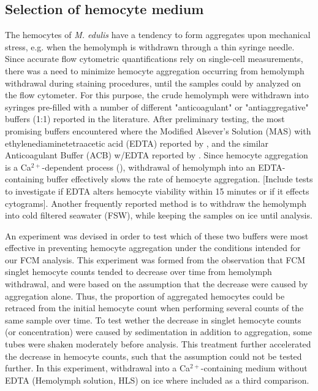 \subsection{Selection of hemocyte medium}
The hemocytes of \emph{M. edulis} have a tendency to form aggregates upon mechanical stress, e.g. when the hemolymph is withdrawn through a thin syringe needle. Since accurate flow cytometric quantifications rely on single-cell measurements, there was a need to minimize hemocyte aggregation occurring from hemolymph withdrawal during staining procedures, until the samples could by analyzed on the flow cytometer. For this purpose, the crude hemolymph were withdrawn into syringes pre-filled with a number of different "anticoagulant" or "antiaggregative" buffers (1:1) reported in the literature. After preliminary testing, the most promising buffers encountered where the Modified Alsever's Solution (MAS) with ethylenediaminetetraacetic acid (EDTA) reported by \cite{LeFoll2010}, and the similar Anticoagulant Buffer (ACB) w/EDTA reported by \cite{Pipe1997}. Since hemocyte aggregation is a Ca$^{2+}$-dependent process (\cite{Rolton2020}), withdrawal of hemolymph into an EDTA-containing buffer effectively slows the rate of hemocyte aggregation. [Include tests to investigate if EDTA alters hemocyte viability within 15 minutes or if it effects cytograms]. Another frequently reported method is to withdraw the hemolymph into cold filtered seawater (FSW), while keeping the samples on ice until analysis.

An experiment was devised in order to test which of these two buffers were most effective in preventing hemocyte aggregation under the conditions intended for our FCM analysis. This experiment was formed from the observation that FCM singlet hemocyte counts tended to decrease over time from hemolymph withdrawal, and were based on the assumption that the decrease were caused by aggregation alone. Thus, the proportion of aggregated hemocytes could be retraced from the initial hemocyte count when performing several counts of the same sample over time. To test wether the decrease in singlet hemocyte counts (or concentration) were caused by sedimentation in addition to aggregation, some tubes were shaken moderately before analysis. This treatment further accelerated the decrease in hemocyte counts, such that the assumption could not be tested further. In this experiment, withdrawal into a Ca$^{2+}$-containing medium without EDTA (Hemolymph solution, HLS) on ice where included as a third comparison.

